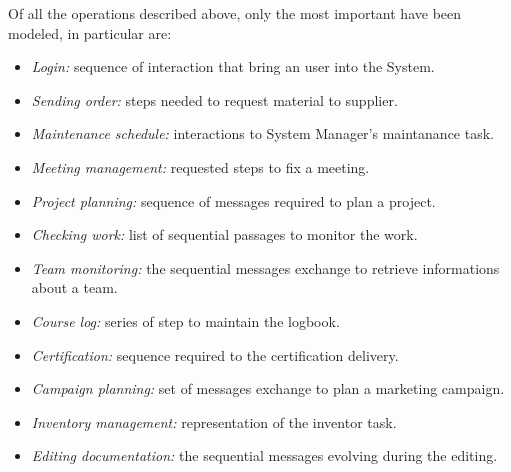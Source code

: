 Of all the operations described above, only the most important have been modeled, in particular are:
\begin{itemize}
 \item \textit{Login:} sequence of interaction that bring an user into the System.
 \item \textit{Sending order:} steps needed to request material to supplier.
 \item \textit{Maintenance schedule:} interactions to System Manager's maintanance task.
 \item \textit{Meeting management:} requested steps to fix a meeting.

 \item \textit{Project planning:} sequence of messages required to plan a project.
 \item \textit{Checking work:} list of sequential passages to monitor the work.
 \item \textit{Team monitoring:} the sequential messages exchange to retrieve informations about a team.

 \item \textit{Course log:} series of step to maintain the logbook.
 \item \textit{Certification:} sequence required to the certification delivery.

 \item \textit{Campaign planning:} set of messages exchange to plan a marketing campaign.

 \item \textit{Inventory management:} representation of the inventor task.

 \item \textit{Editing documentation:} the sequential messages evolving during the editing.
\end{itemize}








